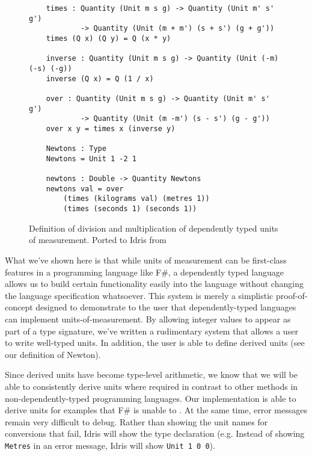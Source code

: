 \begin{figure}[h]
  \caption{Definition of division and multiplication of dependently typed units
  of measurement. Ported to Idris from \protect\cite{gundry2013}}
  \label{division}
  \begin{lstlisting}
    times : Quantity (Unit m s g) -> Quantity (Unit m' s' g') 
            -> Quantity (Unit (m + m') (s + s') (g + g'))
    times (Q x) (Q y) = Q (x * y)

    inverse : Quantity (Unit m s g) -> Quantity (Unit (-m) (-s) (-g))
    inverse (Q x) = Q (1 / x)

    over : Quantity (Unit m s g) -> Quantity (Unit m' s' g')
            -> Quantity (Unit (m -m') (s - s') (g - g'))
    over x y = times x (inverse y)

    Newtons : Type
    Newtons = Unit 1 -2 1

    newtons : Double -> Quantity Newtons
    newtons val = over 
        (times (kilograms val) (metres 1)) 
        (times (seconds 1) (seconds 1))
  \end{lstlisting}
\end{figure}

What we've shown here is that while units of measurement can be first-class
features in a programming language like F\#, a dependently typed language allows
us to build certain functionality easily into the language without changing the
language specification whatsoever. This system is merely a simplistic
proof-of-concept designed to demonstrate to the user that dependently-typed
languages can implement units-of-measurement. By allowing integer values to
appear as part of a type signature, we've written a rudimentary system that
allows a user to write well-typed units. In addition, the user is able to define
derived units (see our definition of Newton). 

Since derived units have become type-level arithmetic, we know that we will be
able to consistently derive units where required in contrast to other methods in
non-dependently-typed programming languages. Our implementation is able to
derive units for examples that F\# is unable to \cite{gundry2013,f_sharp_units}.
At the same time, error messages remain very difficult to debug. Rather than
showing the unit names for conversions that fail, Idris will show the type
declaration (e.g. Instead of showing \texttt{Metres} in an error message, Idris
will show \texttt{Unit 1 0 0}). 